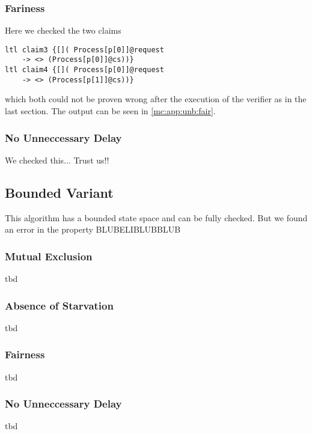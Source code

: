 \documentclass{llncs}
\begin{document}
\subsubsection{Fariness}

Here we checked the two claims

\begin{lstlisting}
ltl claim3 {[]( Process[p[0]]@request 
    -> <> (Process[p[0]]@cs))}
ltl claim4 {[]( Process[p[0]]@request 
    -> <> (Process[p[1]]@cs))}
\end{lstlisting}

which both could not be proven wrong after the execution of the verifier as in the last section.
The output can be seen in \ref{mc:app:unb:fair}.

\subsubsection{No Unneccessary Delay}

We checked this... Trust us!!

\subsection{Bounded Variant}

This algorithm has a bounded state space and can be fully checked.
But we found an error in the property BLUBELIBLUBBLUB

\subsubsection{Mutual Exclusion}

tbd

\subsubsection{Absence of Starvation}

tbd

\subsubsection{Fairness}

tbd

\subsubsection{No Unneccessary Delay}

tbd
\end{document}
